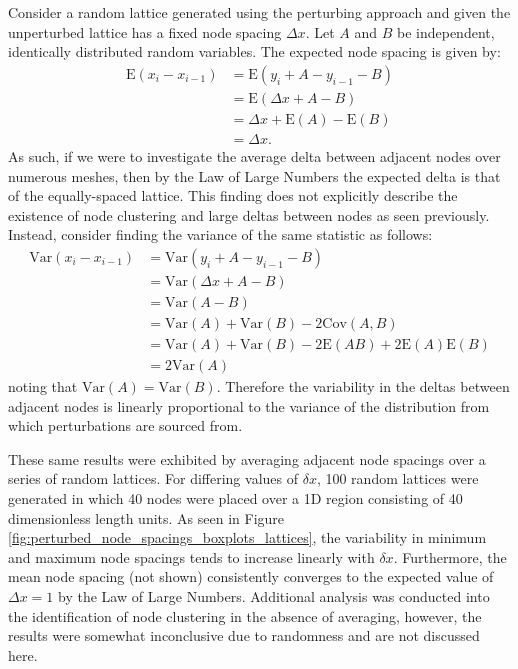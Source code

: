 \documentclass[11pt,titlepage,a4paper]{article}
\begin{document}
			Consider a random lattice generated using the perturbing approach and given the unperturbed lattice has a fixed node spacing $\Delta x$. Let $A$ and $B$ be independent, identically distributed random variables. The expected node spacing is given by:
			\begin{align*}
				\mathrm{E} \left(x_i - x_{i-1} \right) &= \mathrm{E} \left(y_i + A - y_{i-1} - B \right) \\
				&= \mathrm{E} \left(\Delta x + A - B \right) \\
				&= \Delta x + \mathrm{E} \left(A \right) - \mathrm{E} \left(B \right) \\
				&= \Delta x.
			\end{align*}
			As such, if we were to investigate the average delta between adjacent nodes over numerous meshes, then by the Law of Large Numbers the expected delta is that of the equally-spaced lattice. This finding does not explicitly describe the existence of node clustering and large deltas between nodes as seen previously. Instead, consider finding the variance of the same statistic as follows:
			\begin{align*}
				\mathrm{Var} \left(x_i - x_{i-1} \right) &= \mathrm{Var} \left(y_i + A - y_{i-1} - B \right) \\
				&= \mathrm{Var} \left(\Delta x + A - B \right) \\
				&= \mathrm{Var} \left(A - B \right) \\
				&= \mathrm{Var} \left(A \right) + \mathrm{Var} \left(B \right) - 2 \mathrm{Cov} \left(A, B \right) \\ 
				&= \mathrm{Var} \left(A \right) + \mathrm{Var} \left(B \right) - 2 \mathrm{E} \left(AB \right) + 2 \mathrm{E} \left(A \right) \mathrm{E} \left(B \right) \\ 
				&= 2 \mathrm{Var} \left(A \right)
			\end{align*}
			noting that $\mathrm{Var} \left(A \right) = \mathrm{Var} \left(B \right)$. Therefore the variability in the deltas between adjacent nodes is linearly proportional to the variance of the distribution from which perturbations are sourced from.
		
			These same results were exhibited by averaging adjacent node spacings over a series of random lattices. For differing values of $\delta x$, 100 random lattices were generated in which 40 nodes were placed over a 1D region consisting of 40 dimensionless length units. As seen in Figure \ref{fig:perturbed_node_spacings_boxplots_lattices}, the variability in minimum and maximum node spacings tends to increase linearly with $\delta x$. Furthermore, the mean node spacing (not shown) consistently converges to the expected value of $\Delta x = 1$ by the Law of Large Numbers. Additional analysis was conducted into the identification of node clustering in the absence of averaging, however, the results were somewhat inconclusive due to randomness and are not discussed here. 
\end{document}
